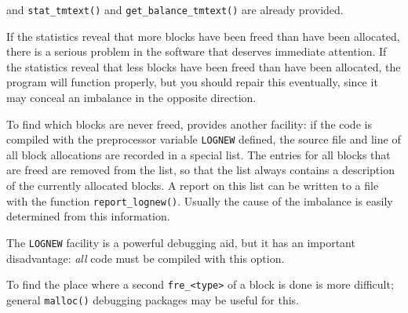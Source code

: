 and \verb+stat_tmtext()+ and \verb+get_balance_tmtext()+ are already provided.
\par
If the statistics reveal that more blocks have been freed than have
been allocated, there is a serious problem in the software that deserves
immediate attention.
If the statistics reveal that less blocks have been freed than have been
allocated,
the program will function properly, but you should repair this
eventually, since it may conceal an imbalance in the opposite direction.
\par
To find which blocks are never freed,
{\Tm} provides another facility:
if the code is compiled with the {\C} preprocessor variable
{\tt LOGNEW} defined,
the source file and line of all {\Tm} block allocations are recorded in a
special list.
The entries for all blocks that are freed are removed from the list,
so that the list always contains a description of the currently allocated
blocks.
A report on this list can be written to a file with the function
\verb+report_lognew()+.
Usually the cause of the imbalance is easily determined from this information.
\par
The {\tt LOGNEW} facility is a powerful debugging aid, but it has an important
disadvantage:
{\em all} \/code must be compiled with this option.
\par
To find the place where a second \verb+fre_<type>+ of a block is done is
more difficult;
general \verb+malloc()+ debugging packages may be useful for this.
